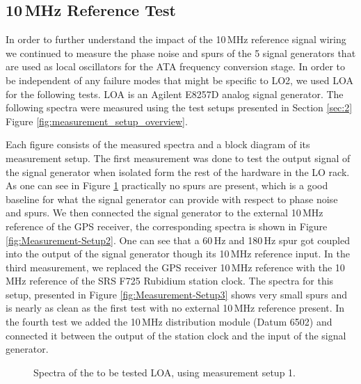 \documentclass[12pt]{article}
\begin{document}
\subsection{10\,MHz Reference Test}

In order to further understand the impact of the 10\,MHz reference signal wiring we continued to measure the phase noise and spurs of the 5 signal generators that are used as local oscillators for the ATA frequency conversion stage. In order to be independent of any failure modes that might be specific to LO2, we used LOA for the following tests. LOA is an Agilent E8257D analog signal generator. The following spectra were measured using the test setups presented in Section \ref{sec:2} Figure \ref{fig:measurement_setup_overview}.

Each figure consists of the measured spectra and a block diagram of its measurement setup. The first measurement was done to test the output signal of the signal generator when isolated form the rest of the hardware in the LO rack. As one can see in Figure \ref{fig:Measurement-Setup1} practically no spurs are present, which is a good baseline for what the signal generator can provide with respect to phase noise and spurs. We then connected the signal generator to the external 10\,MHz reference of the GPS receiver, the corresponding spectra is shown in Figure \ref{fig:Measurement-Setup2}. One can see that a 60\,Hz and 180\,Hz spur got coupled into the output of the signal generator though its 10\,MHz reference input. 
In the third measurement, we replaced the GPS receiver 10\,MHz reference with the 10\,MHz reference of the SRS F725 Rubidium station clock. The spectra for this setup, presented in Figure \ref{fig:Measurement-Setup3} shows very small spurs and is nearly as clean as the first test with no external 10\,MHz reference present. In the fourth test we added the 10\,MHz distribution module (Datum 6502) and connected it between the output of the station clock and the input of the signal generator. 
%
\begin{figure}[ht!]
\caption{Spectra of the to be tested LOA, using measurement setup 1.}
\label{fig:Measurement-Setup1}
\end{figure}
\end{document}
